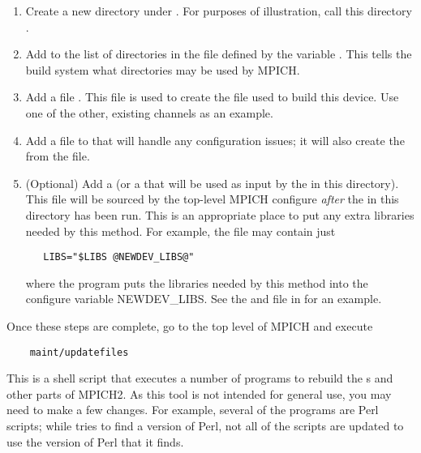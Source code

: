 \documentclass{article}
\begin{document}
\begin{enumerate}
\item Create a new directory under .  For purposes
  of illustration, call this directory .
\item Add  to the list of directories in the file
   defined by the variable
   .  This tells the build system what directories
  may be used by MPICH.
\item Add a file  .  This file
  is used to create the  file used to build this
  device.  Use one of the other, existing channels as an example.
\item Add a  file to
   that will handle any configuration
  issues; it will also create the  from the 
  file.
\item (Optional) Add a  (or a  that will be
  used as input by the  in this directory).  This file will be
  sourced by the top-level MPICH configure \emph{after} the 
  in this directory has been run.  This is an appropriate place to put any
  extra libraries needed by this method.  For example, the file
   may contain just
\begin{verbatim}
   LIBS="$LIBS @NEWDEV_LIBS@"
\end{verbatim} 
  where the  program puts the libraries needed by this method
  into the configure variable NEWDEV_LIBS.  See the  and
   file in  for an example.
\end{enumerate}

Once these steps are complete, go to the top level of MPICH and execute
\begin{verbatim}
    maint/updatefiles 
\end{verbatim}
This is a shell script that executes a number of programs to rebuild the
s and other parts of MPICH2.  As this tool is not intended for
general use, you may need to make a few changes.  For example, several of the
programs are Perl scripts; while  tries to find a version of
Perl, not all of the scripts are updated to use the version of Perl that it
finds.  
\end{document}
